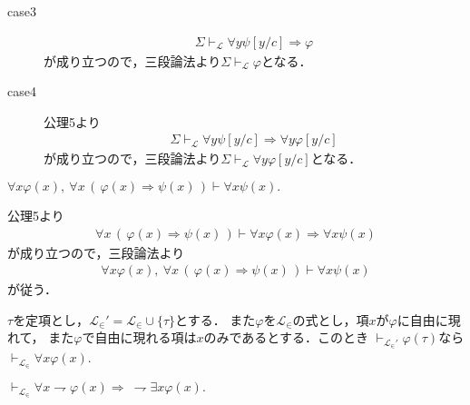 \begin{sketch}
\begin{description}
			\item[case3]
				\begin{align}
					\Sigma \vdash_{\mathcal{L}} \forall y \psi[y/c] \Longrightarrow \varphi
				\end{align}
				が成り立つので，三段論法より$\Sigma \vdash_{\mathcal{L}} \varphi$となる．
				
			\item[case4]
				公理5より
				\begin{align}
					\Sigma \vdash_{\mathcal{L}} \forall y \psi[y/c] \Longrightarrow \forall y \varphi[y/c]
				\end{align}
				が成り立つので，三段論法より$\Sigma \vdash_{\mathcal{L}} 
				\forall y \varphi[y/c]$となる．
				\QED
		\end{description}
	\end{sketch}
	
	\begin{screen}
		$\forall x \varphi(x),\ \forall x\, (\, \varphi(x) \Longrightarrow \psi(x)\, )
		\vdash \forall x \psi(x).$
	\end{screen}
	
	公理5より
	\begin{align}
		\forall x\, (\, \varphi(x) \Longrightarrow \psi(x)\, )
		\vdash \forall x \varphi(x) \Longrightarrow \forall x \psi(x)
	\end{align}
	が成り立つので，三段論法より
	\begin{align}
		\forall x \varphi(x),\ \forall x\, (\, \varphi(x) \Longrightarrow \psi(x)\, )
		\vdash \forall x \psi(x)
	\end{align}
	が従う．
	
	\begin{screen}
		$\tau$を定項とし，$\mathcal{L}_{\in}' = \mathcal{L}_{\in} \cup \{\tau\}$とする．
		また$\varphi$を$\mathcal{L}_{\in}$の式とし，項$x$が$\varphi$に自由に現れて，
		また$\varphi$で自由に現れる項は$x$のみであるとする．このとき
		$\vdash_{\mathcal{L}_{\in}'} \varphi(\tau)$なら
		$\vdash_{\mathcal{L}_{\in}} \forall x \varphi(x)$.
	\end{screen}
	
	\begin{screen}
		\begin{logicalthm}[De Morgan 1]
			$\vdash_{\mathcal{L}_{\in}} \forall x \rightharpoondown \varphi(x) 
			\Longrightarrow\ \rightharpoondown \exists x \varphi(x).$
		\end{logicalthm}
	\end{screen}
	
